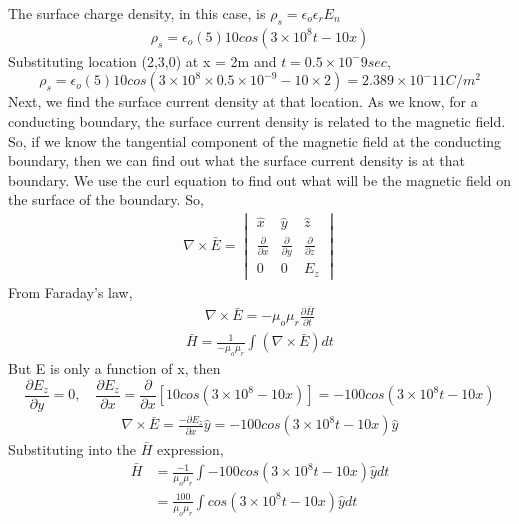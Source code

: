 \begin{exmp}
The surface charge density, in this case, is $\rho_s = \epsilon_o\epsilon_rE_n$
\begin{align*}
\rho_s = \epsilon_o(5)10cos(3\times10^8t - 10x)
\end{align*}
Substituting location (2,3,0) at x = 2m and $t = 0.5\times 10^-9sec$,
\begin{dmath*}
\rho_s = \epsilon_o(5)10cos(3\times 10^8\times 0.5\times10^{-9} - 10\times 2) = 2.389\times 10^-11 C/m^2
\end{dmath*}
Next, we find the surface current density at that location. As we know, for a conducting boundary, the surface current density is related to the magnetic field. \\
So, if we know the tangential component of the magnetic field at the conducting boundary, then we can find out what the surface current density is at that boundary. We use the curl equation to find out what will be the magnetic field on the surface of the boundary. So,
\begin{align*}
\nabla\times \bar{E} = \begin{vmatrix}
\hat{x} &\hat{y} &\hat{z}\\
\frac{\partial}{\partial x} & \frac{\partial}{\partial y} & \frac{\partial}{\partial z} \\
0 &0 &E_z
\end{vmatrix}
\end{align*}
From Faraday's law,
\begin{align*}
\nabla\times\bar{E} = -\mu_o\mu_r\frac{\partial\bar{H}}{\partial t}
\end{align*}
\begin{align*}
\bar{H} = \frac{1}{-\mu_o\mu_r}\int (\nabla\times\bar{E})dt
\end{align*}
But E is only a function of x, then
\begin{dmath*}
\frac{\partial E_z}{\partial y} = 0,\quad \frac{\partial E_z}{\partial x} = \frac{\partial}{\partial x}\left[ 10cos(3\times 10^8 - 10x) \right] = -100cos(3\times 10^8 t - 10x)
\end{dmath*}
\begin{align*}
\nabla\times\bar{E} = \frac{-\partial E_z}{\partial x}\hat{y} = -100cos(3\times10^8t - 10x)\hat{y}
\end{align*}
Substituting into the $\bar{H}$ expression,
\begin{align*}
\bar{H} &= \frac{-1}{\mu_o\mu_r}\int-100cos(3\times 10^8t - 10x)\hat{y}dt \\
&=\frac{100}{\mu_o\mu_r}\int cos(3\times 10^8t - 10x)\hat{y}dt \\

\end{align*}
\end{exmp}
